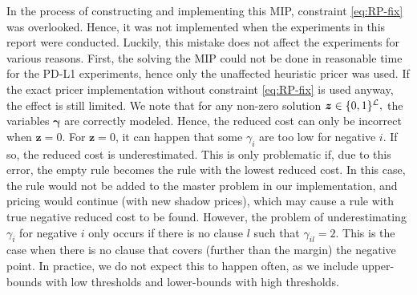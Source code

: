 \begin{note}
    In the process of constructing and implementing this MIP, constraint \eqref{eq:RP-fix} was overlooked.
    Hence, it was not implemented when the experiments in this report were conducted.
    Luckily, this mistake does not affect the experiments for various reasons.
    First, the solving the MIP could not be done in reasonable time for the PD-L1 experiments,
    hence only the unaffected heuristic pricer was used.
    If the exact pricer implementation without constraint \eqref{eq:RP-fix} is used anyway, the effect is still limited.
    We note that for any non-zero solution $\bm{z} \in \{0,1\}^{\mathcal{L}},$ the variables $\bm{\gamma}$ are correctly modeled.
    Hence, the reduced cost can only be incorrect when $\bm{z} = 0$.
    For $\bm{z} = 0$, it can happen that some $\gamma_i$ are too low for negative $i$.
    If so, the reduced cost is underestimated.
    This is only problematic if, due to this error, the empty rule becomes the rule with the lowest reduced cost.
    In this case, the rule would not be added to the master problem in our implementation,
    and pricing would continue (with new shadow prices),
    which may cause a rule with true negative reduced cost to be found.
    However, the problem of underestimating $\gamma_i$ for negative $i$ only occurs if there is no
    clause $l$ such that $\gamma_{il} = 2$.
    This is the case when there is no clause that covers (further than the margin) the negative point.
    In practice, we do not expect this to happen often,
    as we include upper-bounds with low thresholds and lower-bounds with high thresholds.
\end{note}

